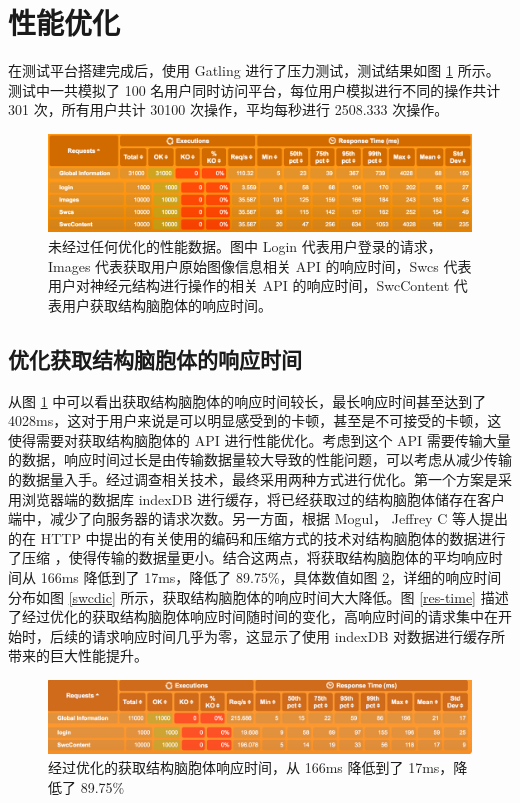 \section{性能优化}

在测试平台搭建完成后，使用 Gatling 进行了压力测试，测试结果如图 \ref{origin} 所示。测试中一共模拟了 100 名用户同时访问平台，每位用户模拟进行不同的操作共计 301 次，所有用户共计 30100 次操作，平均每秒进行 2508.333 次操作。

\begin{figure}[!ht]
\centering
\includegraphics[width=148mm]{images/origin}
\caption{未经过任何优化的性能数据。图中 Login 代表用户登录的请求，Images 代表获取用户原始图像信息相关 API 的响应时间，Swcs 代表用户对神经元结构进行操作的相关 API 的响应时间，SwcContent 代表用户获取结构脑胞体的响应时间。}
\label{origin}
\end{figure}

\subsection{优化获取结构脑胞体的响应时间}
从图 \ref{origin} 中可以看出获取结构脑胞体的响应时间较长，最长响应时间甚至达到了 4028ms，这对于用户来说是可以明显感受到的卡顿，甚至是不可接受的卡顿，这使得需要对获取结构脑胞体的 API 进行性能优化。考虑到这个 API 需要传输大量的数据，响应时间过长是由传输数据量较大导致的性能问题，可以考虑从减少传输的数据量入手。经过调查相关技术，最终采用两种方式进行优化。第一个方案是采用浏览器端的数据库 indexDB 进行缓存，将已经获取过的结构脑胞体储存在客户端中，减少了向服务器的请求次数。另一方面，根据 Mogul， Jeffrey C 等人提出的在 HTTP 中提出的有关使用的编码和压缩方式的技术对结构脑胞体的数据进行了压缩 ，使得传输的数据量更小。结合这两点，将获取结构脑胞体的平均响应时间从 166ms 降低到了 17ms，降低了 89.75\%，具体数值如图 \ref{swccontent}，详细的响应时间分布如图 \ref{swcdic} 所示，获取结构脑胞体的响应时间大大降低。图 \ref{res-time} 描述了经过优化的获取结构脑胞体响应时间随时间的变化，高响应时间的请求集中在开始时，后续的请求响应时间几乎为零，这显示了使用 indexDB 对数据进行缓存所带来的巨大性能提升。

\begin{figure}[!ht]
\centering
\includegraphics[width=148mm]{images/swccontent}
\caption{经过优化的获取结构脑胞体响应时间，从 166ms 降低到了 17ms，降低了 89.75\%}
\label{swccontent}
\end{figure}

